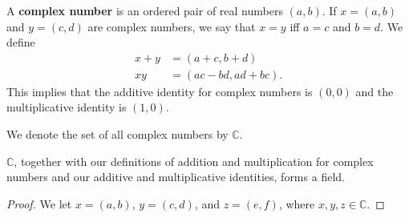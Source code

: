 \documentclass[12pt]{article}
\begin{document}
\begin{defn}
  A \textbf{complex number} is an ordered pair of real numbers $(a,b)$. If $x =
  (a,b)$ and $y = (c,d)$ are complex numbers, we say that $x = y$ iff $a = c$ and $b
  = d$. We define
  \begin{align*}
    x + y &= (a + c, b + d)\\
    xy &= (ac - bd, ad + bc).
  \end{align*}
  This implies that the additive identity for complex numbers is $(0,0)$ and the
  multiplicative identity is $(1,0)$.

  We denote the set of all complex numbers by $\mathbb{C}$.
\end{defn}

\begin{thm}
  $\mathbb{C}$, together with our definitions of addition and multiplication for
  complex numbers and our additive and multiplicative identities, forms a field.

  \begin{proof}
    We let $x = (a,b)$, $y = (c,d)$, and $z = (e,f)$, where $x,y,z \in \mathbb{C}$.


\end{proof}
\end{thm}
\end{document}
